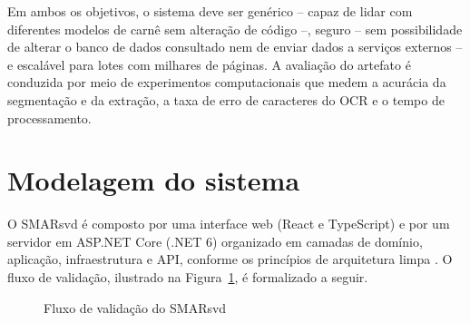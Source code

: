 \documentclass[article,12pt,oneside,a4paper,english,brazil]{abntex2}
\begin{document}
Em ambos os objetivos, o sistema deve ser genérico -- capaz de lidar com diferentes
modelos de carnê sem alteração de código --, seguro -- sem possibilidade de alterar o
banco de dados consultado nem de enviar dados a serviços externos -- e escalável para
lotes com milhares de páginas. A avaliação do artefato é conduzida por meio de
experimentos computacionais que medem a acurácia da segmentação e da extração, a taxa
de erro de caracteres do OCR e o tempo de processamento.

\section{Modelagem do sistema}\label{sec:modelagem}

O SMARsvd é composto por uma interface web (React e TypeScript) e por um servidor em
ASP.NET Core (.NET 6) organizado em camadas de domínio, aplicação, infraestrutura e
API, conforme os princípios de arquitetura limpa \cite{martin2017}. O fluxo de
validação, ilustrado na Figura~\ref{fig:fluxo}, é formalizado a seguir.

\begin{figure}[htb]
\centering
\caption{Fluxo de validação do SMARsvd}\label{fig:fluxo}
\end{figure}
\end{document}
